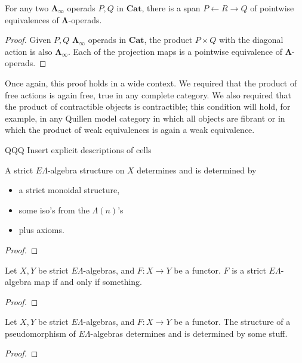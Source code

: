 \documentclass{amsbook} %
\newcommand{\mb}{\mathbf}
\newcommand{\EL}{E\Lambda}
\numberwithin{section}{chapter}
\begin{document}
\begin{prop}
For any two $\mb{\Lambda}_{\infty}$ operads $P,Q$ in $\mb{Cat}$, there is a span $P \leftarrow R \rightarrow Q$  of pointwise equivalences of $\mb{\Lambda}$-operads.
\end{prop}
\begin{proof}
Given $P,Q$ $\mb{\Lambda}_{\infty}$ operads in $\mb{Cat}$, the product $P \times Q$ with the diagonal action is also $\mb{\Lambda}_{\infty}$.  Each of the projection maps is a pointwise equivalence of $\mb{\Lambda}$-operads.
\end{proof}
\begin{rem}
Once again, this proof holds in a wide context.  We required that the product of free actions is again free, true in any complete category.  We also required that the product of contractible objects is contractible; this condition will hold, for example, in any Quillen model category in which all objects are fibrant or in which the product of weak equivalences is again a weak equivalence.
\end{rem}

QQQ Insert explicit descriptions of cells
\begin{prop}\label{el_via_moncats}
A strict $\EL$-algebra structure on $X$ determines and is determined by
\begin{itemize}
\item a strict monoidal structure,
\item some iso's from the $\Lambda(n)$'s
\item plus axioms.
\end{itemize}
\end{prop}
\begin{proof}

\end{proof}

\begin{prop}\label{el_strictmap}
Let $X,Y$ be strict $\EL$-algebras, and $F:X \to Y$ be a functor. $F$ is a strict $\EL$-algebra map if and only if something.
\end{prop}
\begin{proof}

\end{proof}

\begin{prop}\label{el_weakmap}
Let $X,Y$ be strict $\EL$-algebras, and $F:X \to Y$ be a functor. The structure of a pseudomorphism of $\EL$-algebras determines and is determined by some stuff.
\end{prop}
\begin{proof}

\end{proof}
\end{document}
